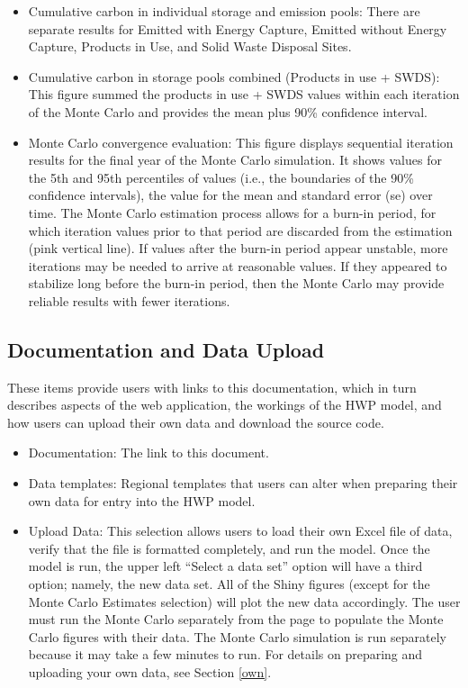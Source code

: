 \documentclass[
]{book}
\providecommand{\tightlist}{%
  \setlength{\itemsep}{0pt}\setlength{\parskip}{0pt}}
\begin{document}
\begin{itemize}
  \begin{itemize}
  \tightlist
  \item
    Cumulative carbon in individual storage and emission pools: There are separate results for Emitted with Energy Capture, Emitted without Energy Capture, Products in Use, and Solid Waste Disposal Sites.\\
  \item
    Cumulative carbon in storage pools combined (Products in use + SWDS): This figure summed the products in use + SWDS values within each iteration of the Monte Carlo and provides the mean plus 90\% confidence interval.\\
  \item
    Monte Carlo convergence evaluation: This figure displays sequential iteration results for the final year of the Monte Carlo simulation. It shows values for the 5th and 95th percentiles of values (i.e., the boundaries of the 90\% confidence intervals), the value for the mean and standard error (se) over time. The Monte Carlo estimation process allows for a burn-in period, for which iteration values prior to that period are discarded from the estimation (pink vertical line). If values after the burn-in period appear unstable, more iterations may be needed to arrive at reasonable values. If they appeared to stabilize long before the burn-in period, then the Monte Carlo may provide reliable results with fewer iterations.
  \end{itemize}
\end{itemize}

\hypertarget{run-doc}{%
\subsection{Documentation and Data Upload}\label{run-doc}}

These items provide users with links to this documentation, which in turn describes aspects of the web application, the workings of the HWP model, and how users can upload their own data and download the source code.

\begin{itemize}
\item
  Documentation: The link to this document.
\item
  Data templates: Regional templates that users can alter when preparing their own data for entry into the HWP model.
\item
  Upload Data: This selection allows users to load their own Excel file of data, verify that the file is formatted completely, and run the model. Once the model is run, the upper left ``Select a data set'' option will have a third option; namely, the new data set. All of the Shiny figures (except for the Monte Carlo Estimates selection) will plot the new data accordingly. The user must run the Monte Carlo separately from the page to populate the Monte Carlo figures with their data. The Monte Carlo simulation is run separately because it may take a few minutes to run. For details on preparing and uploading your own data, see Section \ref{own}.
\end{itemize}
\end{document}
